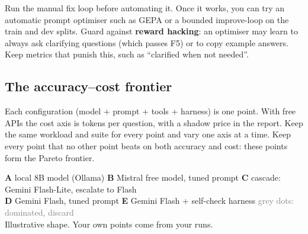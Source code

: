 \documentclass[11pt,a4paper]{article}
\begin{document}
Run the manual fix loop before automating it. Once it works, you can try an automatic prompt
optimiser such as GEPA or a bounded improve-loop on the train and dev splits. Guard against
\textbf{reward hacking}: an optimiser may learn to always ask clarifying questions (which passes
F5) or to copy example answers. Keep metrics that punish this, such as ``clarified when not
needed''.

\subsection{The accuracy--cost frontier}

Each configuration (model + prompt + tools + harness) is one point. With free APIs the cost axis is tokens per question, with a shadow price in the report. Keep the same workload and
suite for every point and vary one axis at a time. Keep every point that no other point beats
on both accuracy and cost: these points form the Pareto frontier.

\begin{center}

{\footnotesize \textbf{A} local 8B model (Ollama) \quad \textbf{B} Mistral free model, tuned prompt \quad
\textbf{C} cascade: Gemini Flash-Lite, escalate to Flash\\ \textbf{D} Gemini Flash, tuned prompt \quad
\textbf{E} Gemini Flash + self-check harness \quad \textcolor{grey}{grey dots: dominated, discard}\\[2pt]
\color{grey} Illustrative shape. Your own points come from your runs.}
\end{center}
\end{document}
